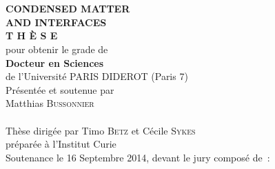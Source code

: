 \documentclass[A4paperpaper,11pt,english]{sphinxmanual}
\begin{document}
    \begin{center}
        \begin{minipage}{0.75\linewidth}
    \begin{center}
             \\ 
            \vspace*{0.3cm}
             \\
            \noindent \textbf{CONDENSED MATTER \\ AND INTERFACES} \\
            \vspace*{0.5cm}
            \noindent \Huge \textbf{T H È S E} \\
            \vspace*{0.3cm}
            \noindent \large {pour obtenir le grade de} \\
            \vspace*{0.3cm}
            \noindent \LARGE \textbf{Docteur en Sciences} \\
            \vspace*{0.3cm}
            \noindent \Large de l'Université PARIS DIDEROT (Paris 7) \\
            \vspace*{0.4cm}
            \noindent \large {Présentée et soutenue par\\}
            \noindent \LARGE Matthias \textsc{Bussonnier} \\
            \vspace*{0.8cm}
             \\
            \vspace*{0.8cm}
            \noindent \Large Thèse dirigée par Timo \textsc{Betz} et Cécile \textsc{Sykes} \\
            \vspace*{0.2cm}
            \noindent \Large préparée à l'Institut Curie \\
            \vspace*{0.2cm}
            \noindent \large Soutenance le 16 Septembre 2014, devant le jury composé de~:\\
            \vspace*{0.5cm}

\end{center}
\end{minipage}
\end{center}
\end{document}
